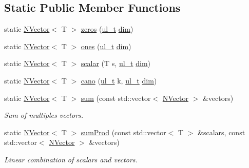 \subsection*{Static Public Member Functions}
\begin{DoxyCompactItemize}
\item 
static \mbox{\hyperlink{class_n_vector}{N\+Vector}}$<$ T $>$ \mbox{\hyperlink{class_n_vector_a6253cef3c39dd9d388bbf7d17069bc51}{zeros}} (\mbox{\hyperlink{group___n_algebra_ga1b140a2034db3f5dfe18a987745df43a}{ul\+\_\+t}} \mbox{\hyperlink{class_n_vector_a7589027db20509ac4d93490bb9a1979a}{dim}})
\item 
static \mbox{\hyperlink{class_n_vector}{N\+Vector}}$<$ T $>$ \mbox{\hyperlink{class_n_vector_afb6358454a8dfaac4963352843b17bbc}{ones}} (\mbox{\hyperlink{group___n_algebra_ga1b140a2034db3f5dfe18a987745df43a}{ul\+\_\+t}} \mbox{\hyperlink{class_n_vector_a7589027db20509ac4d93490bb9a1979a}{dim}})
\item 
static \mbox{\hyperlink{class_n_vector}{N\+Vector}}$<$ T $>$ \mbox{\hyperlink{class_n_vector_add6abbdea5f58e6887367860aa0f619d}{scalar}} (T s, \mbox{\hyperlink{group___n_algebra_ga1b140a2034db3f5dfe18a987745df43a}{ul\+\_\+t}} \mbox{\hyperlink{class_n_vector_a7589027db20509ac4d93490bb9a1979a}{dim}})
\item 
static \mbox{\hyperlink{class_n_vector}{N\+Vector}}$<$ T $>$ \mbox{\hyperlink{class_n_vector_ac2322798525dfd0aadf87ea51e3f2699}{cano}} (\mbox{\hyperlink{group___n_algebra_ga1b140a2034db3f5dfe18a987745df43a}{ul\+\_\+t}} k, \mbox{\hyperlink{group___n_algebra_ga1b140a2034db3f5dfe18a987745df43a}{ul\+\_\+t}} \mbox{\hyperlink{class_n_vector_a7589027db20509ac4d93490bb9a1979a}{dim}})
\item 
static \mbox{\hyperlink{class_n_vector}{N\+Vector}}$<$ T $>$ \mbox{\hyperlink{class_n_vector_af0f5749405554fc23a0af67ad4f9e9e5}{sum}} (const std\+::vector$<$ \mbox{\hyperlink{class_n_vector}{N\+Vector}} $>$ \&vectors)
\begin{DoxyCompactList}\small\item\em Sum of multiples vectors. \end{DoxyCompactList}\item 
static \mbox{\hyperlink{class_n_vector}{N\+Vector}}$<$ T $>$ \mbox{\hyperlink{class_n_vector_a89ea4dcaa84313e6446e0be35ec7bbe1}{sum\+Prod}} (const std\+::vector$<$ T $>$ \&scalars, const std\+::vector$<$ \mbox{\hyperlink{class_n_vector}{N\+Vector}} $>$ \&vectors)
\begin{DoxyCompactList}\small\item\em Linear combination of {\ttfamily scalars} and {\ttfamily vectors}. \end{DoxyCompactList}\end{DoxyCompactItemize}
